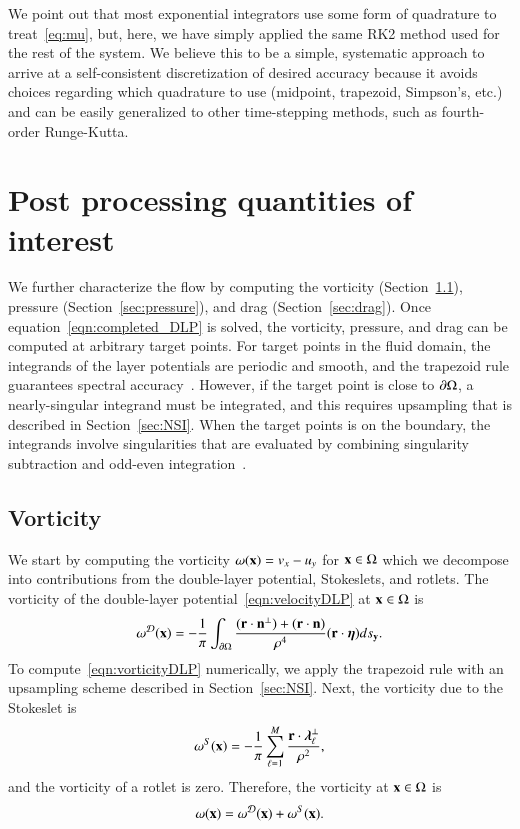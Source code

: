 \documentclass[preprint, 10pt]{elsarticle}
\begin{document}
We point out that most exponential integrators use some form of quadrature to treat~\eqref{eq:mu}, but, here, we have simply applied the same RK2 method used for the rest of the system. We believe this to be a simple, systematic approach to arrive at a self-consistent discretization of desired accuracy because it avoids choices regarding which quadrature to use (midpoint, trapezoid, Simpson's, etc.) and can be easily generalized to other time-stepping methods, such as fourth-order Runge-Kutta. 


\section{Post processing quantities of interest}
\label{s:qoi}
We further characterize the flow by computing the vorticity
(Section~\ref{sec:vorticity}), pressure (Section~\ref{sec:pressure}),
and drag (Section~\ref{sec:drag}).  Once
equation~\eqref{eqn:completed_DLP} is solved, the vorticity, pressure,
and drag can be computed at arbitrary target points.  For target points
in the fluid domain, the integrands of the layer potentials are periodic
and smooth, and the trapezoid rule guarantees spectral
accuracy~\cite{tre-wei2014}.  However, if the target point is close to
${\partial} \Omega$, a nearly-singular integrand must be integrated, and this
requires upsampling that is described in Section~\ref{sec:NSI}.  When
the target points is on the boundary, the integrands involve
singularities that are evaluated by combining singularity subtraction
and odd-even integration~\cite{sid-isr1988}.  

\subsection{Vorticity}
\label{sec:vorticity}
We start by computing the vorticity $\omega({\mathbf{x}}) = v_x - u_y$ for ${\mathbf{x}}
\in \Omega$ which we decompose into contributions from the double-layer
potential, Stokeslets, and rotlets.  The vorticity of the double-layer
potential~\eqref{eqn:velocityDLP} at
${\mathbf{x}} \in \Omega$ is
\begin{align}
  \omega^{{\mathcal{D}}}({\mathbf{x}}) = -\frac{1}{\pi}\int_{{\partial}\Omega} 
    \frac{({\mathbf{r}} \cdot {\mathbf{n}}^\perp) + ({\mathbf{r}} \cdot {\mathbf{n}})}{\rho^4}
    ({\mathbf{r}} \cdot {\boldsymbol\eta}) ds_{{\mathbf{y}}}.
  \label{eqn:vorticityDLP}
\end{align}
To compute~\eqref{eqn:vorticityDLP} numerically, we apply the trapezoid
rule with an upsampling scheme described in Section~\ref{sec:NSI}.
Next, the vorticity due to the Stokeslet is
\begin{align*}
  \omega^S({\mathbf{x}}) = -\frac{1}{\pi} \sum_{\ell=1}^{M} 
    \frac{{\mathbf{r}} \cdot {\boldsymbol\lambda}_\ell^\perp}{\rho^2},
\end{align*}
and the vorticity of a rotlet is zero.  Therefore, the vorticity at ${\mathbf{x}}
\in \Omega$ is
\begin{align*}
  \omega({\mathbf{x}}) = \omega^{\mathcal{D}}({\mathbf{x}}) + \omega^S({\mathbf{x}}).
\end{align*}
\end{document}
